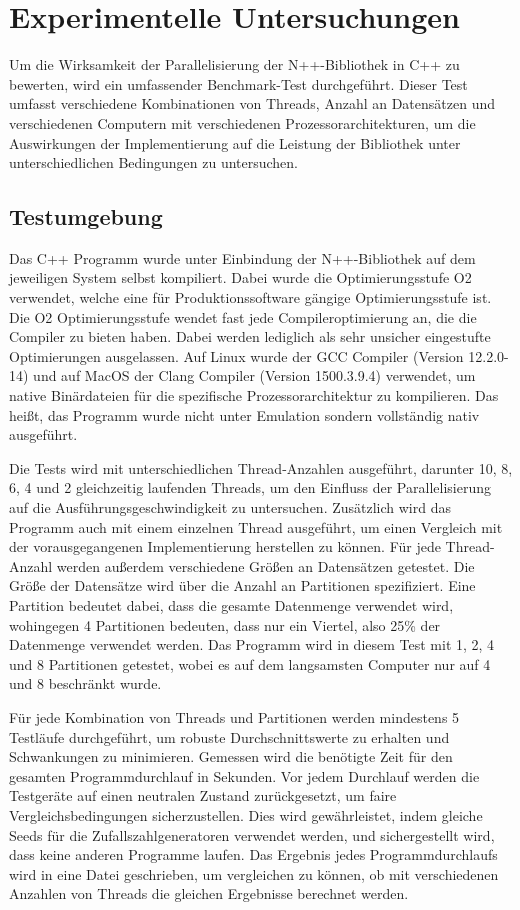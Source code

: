 \chapter{Experimentelle Untersuchungen}

Um die Wirksamkeit der Parallelisierung der N++-Bibliothek in C++ zu bewerten, wird ein umfassender Benchmark-Test durchgeführt. Dieser Test umfasst verschiedene Kombinationen von Threads, Anzahl an Datensätzen und verschiedenen Computern mit verschiedenen Prozessorarchitekturen, um die Auswirkungen der Implementierung auf die Leistung der Bibliothek unter unterschiedlichen Bedingungen zu untersuchen.

\section{Testumgebung}

Das C++ Programm wurde unter Einbindung der N++-Bibliothek auf dem jeweiligen System selbst kompiliert. Dabei wurde die Optimierungsstufe O2 verwendet, welche eine für Produktionssoftware gängige Optimierungsstufe ist. Die O2 Optimierungsstufe wendet fast jede Compileroptimierung an, die die Compiler zu bieten haben. Dabei werden lediglich als sehr unsicher eingestufte Optimierungen ausgelassen. Auf Linux wurde der GCC Compiler (Version 12.2.0-14) und auf MacOS der Clang Compiler (Version 1500.3.9.4) verwendet, um native Binärdateien für die spezifische Prozessorarchitektur zu kompilieren. Das heißt, das Programm wurde nicht unter Emulation sondern vollständig nativ ausgeführt.

Die Tests wird mit unterschiedlichen Thread-Anzahlen ausgeführt, darunter 10, 8, 6, 4 und 2 gleichzeitig laufenden Threads, um den Einfluss der Parallelisierung auf die Ausführungsgeschwindigkeit zu untersuchen. Zusätzlich wird das Programm auch mit einem einzelnen Thread ausgeführt, um einen Vergleich mit der vorausgegangenen Implementierung herstellen zu können. Für jede Thread-Anzahl werden außerdem verschiedene Größen an Datensätzen getestet. Die Größe der Datensätze wird über die Anzahl an Partitionen spezifiziert. Eine Partition bedeutet dabei, dass die gesamte Datenmenge verwendet wird, wohingegen 4 Partitionen bedeuten, dass nur ein Viertel, also 25\% der Datenmenge verwendet werden. Das Programm wird in diesem Test mit 1, 2, 4 und 8 Partitionen getestet, wobei es auf dem langsamsten Computer nur auf 4 und 8 beschränkt wurde.

Für jede Kombination von Threads und Partitionen werden mindestens 5 Testläufe durchgeführt, um robuste Durchschnittswerte zu erhalten und Schwankungen zu minimieren. Gemessen wird die benötigte Zeit für den gesamten Programmdurchlauf in Sekunden. Vor jedem Durchlauf werden die Testgeräte auf einen neutralen Zustand zurückgesetzt, um faire Vergleichsbedingungen sicherzustellen. Dies wird gewährleistet, indem gleiche Seeds für die Zufallszahlgeneratoren verwendet werden, und sichergestellt wird, dass keine anderen Programme laufen.
Das Ergebnis jedes Programmdurchlaufs wird in eine Datei geschrieben, um vergleichen zu können, ob mit verschiedenen Anzahlen von Threads die gleichen Ergebnisse berechnet werden.

